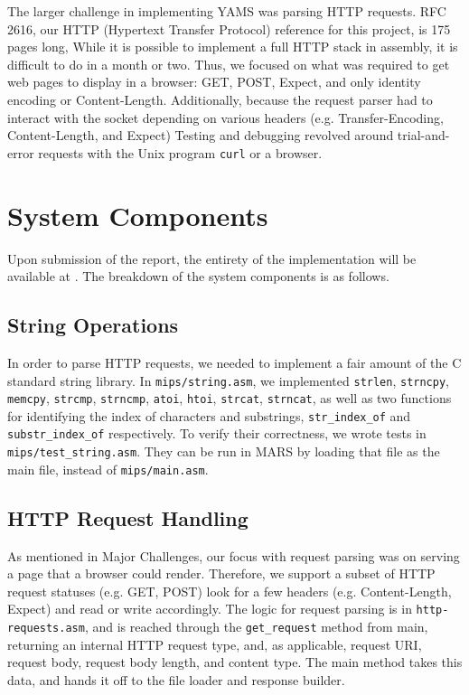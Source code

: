 \documentclass[journal,10pt]{IEEEtran}
\begin{document}
The larger challenge in implementing YAMS was parsing HTTP requests. RFC
2616\cite{Leach}, our HTTP (Hypertext Transfer Protocol) reference for this
project, is 175 pages long, While it is possible to implement a full HTTP stack
in assembly, it is difficult to do in a month or two. Thus, we focused on what
was required to get web pages to display in a browser: GET, POST, Expect, and
only identity encoding or Content-Length. Additionally, because the request
parser had to interact with the socket depending on various headers (e.g.
Transfer-Encoding, Content-Length, and Expect) Testing and debugging revolved
around trial-and-error requests with the Unix program \texttt{curl} or a browser.

\section{System Components}

Upon submission of the report, the entirety of the implementation will be available at \cite{Brennan}. The breakdown of the system components is as follows.

\subsection{String Operations}

In order to parse HTTP requests, we needed to implement a fair amount of the C
standard string library.  In \texttt{mips/string.asm}, we implemented
\texttt{strlen}, \texttt{strncpy}, \texttt{memcpy}, \texttt{strcmp},
\texttt{strncmp}, \texttt{atoi}, \texttt{htoi}, \texttt{strcat},
\texttt{strncat}, as well as two functions for identifying the index of
characters and substrings, \texttt{str\_index\_of} and
\texttt{substr\_index\_of} respectively.  To verify their correctness, we wrote
tests in \texttt{mips/test\_string.asm}.  They can be run in MARS by loading
that file as the main file, instead of \texttt{mips/main.asm}.

\subsection{HTTP Request Handling}

As mentioned in Major Challenges, our focus with request parsing was on serving
a page that a browser could render. Therefore, we support a subset of HTTP
request statuses (e.g. GET, POST) look for a few headers (e.g. Content-Length,
Expect) and read or write accordingly. The logic for request parsing is in
\texttt{http-requests.asm}, and is reached through the \texttt{get\_request}
method from main, returning an internal HTTP request type, and, as applicable,
request URI, request body, request body length, and content type. The main
method takes this data, and hands it off to the file loader and response builder.
\end{document}

